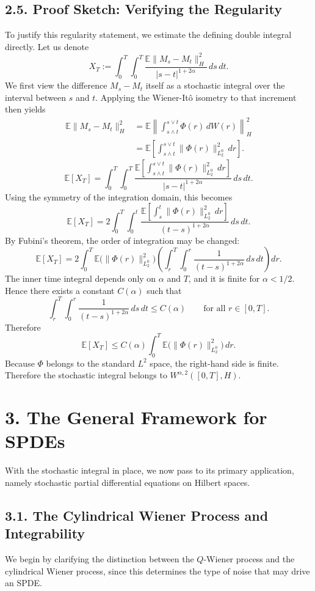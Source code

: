 \documentclass[11pt]{article}
\theoremstyle{definition}
\theoremstyle{remark}
\begin{document}
\subsection*{2.5. Proof Sketch: Verifying the Regularity}
To justify this regularity statement, we estimate the defining double integral directly. Let us denote
\[
X_T
:=
\int_0^T\int_0^T
\frac{\mathbb E\|M_s-M_t\|_H^2}{|s-t|^{1+2\alpha}}
\,ds\,dt.
\]
We first view the difference \(M_s-M_t\) itself as a stochastic integral over the interval between \(s\) and \(t\). Applying the Wiener-It\^o isometry to that increment then yields
\begin{align*}
\mathbb E\|M_s-M_t\|_H^2
&=
\mathbb E\left\|\int_{s\wedge t}^{s\vee t}\Phi(r)\,dW(r)\right\|_H^2 \\
&=
\mathbb E\left[\int_{s\wedge t}^{s\vee t}\|\Phi(r)\|_{L_2^0}^2\,dr\right].
\end{align*}
\[
\mathbb E[X_T]
=
\int_0^T\int_0^T
\frac{\mathbb E\left[\int_{s\wedge t}^{s\vee t}\|\Phi(r)\|_{L_2^0}^2\,dr\right]}
{|s-t|^{1+2\alpha}}
\,ds\,dt.
\]
Using the symmetry of the integration domain, this becomes
\[
\mathbb E[X_T]
=
2\int_0^T\int_0^t
\frac{\mathbb E\left[\int_s^t \|\Phi(r)\|_{L_2^0}^2\,dr\right]}
{(t-s)^{1+2\alpha}}
\,ds\,dt.
\]
By Fubini's theorem, the order of integration may be changed:
\[
\mathbb E[X_T]
=
2\int_0^T
\mathbb E\bigl(\|\Phi(r)\|_{L_2^0}^2\bigr)
\left(
\int_r^T\int_0^r \frac{1}{(t-s)^{1+2\alpha}}\,ds\,dt
\right)dr.
\]
The inner time integral depends only on \(\alpha\) and \(T\), and it is finite for \(\alpha<1/2\). Hence there exists a constant \(C(\alpha)\) such that
\[
\int_r^T\int_0^r \frac{1}{(t-s)^{1+2\alpha}}\,ds\,dt
\le C(\alpha)
\qquad \text{for all } r\in[0,T].
\]
Therefore
\[
\mathbb E[X_T]
\le
C(\alpha)\int_0^T \mathbb E\bigl(\|\Phi(r)\|_{L_2^0}^2\bigr)\,dr.
\]
Because \(\Phi\) belongs to the standard \(L^2\) space, the right-hand side is finite. Therefore the stochastic integral belongs to \(W^{\alpha,2}([0,T],H)\).

\section*{3. The General Framework for SPDEs}
With the stochastic integral in place, we now pass to its primary application, namely stochastic partial differential equations on Hilbert spaces.

\subsection*{3.1. The Cylindrical Wiener Process and Integrability}
We begin by clarifying the distinction between the \(Q\)-Wiener process and the cylindrical Wiener process, since this determines the type of noise that may drive an SPDE.
\end{document}

